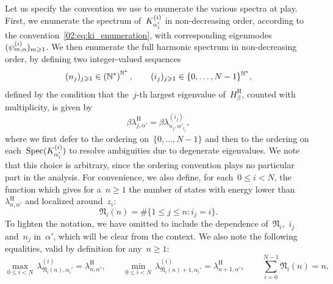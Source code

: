     Let us specify the convention we use to enumerate the various spectra at play.
    First, we enumerate the spectrum of~$K^{(i)}_{\alpha_i'}$ in non-decreasing order, according to the convention~\eqref{02:eq:ki_enumeration}, with corresponding eigenmodes~$(\psi^{(i)}_{m,\alpha})_{m\geqslant 1}$.
    We then enumerate the full harmonic spectrum in non-decreasing order, by defining two integer-valued sequences
    \begin{equation}
        \label{02:eq:eigenstate_enumeration}
        (n_j)_{j\geqslant 1}\in \left(\mathbb{N}^*\right)^{\mathbb{N}^*},\qquad (i_j)_{j\geqslant 1}\in \{0,\dots,N-1\}^{\mathbb{N}^*},
    \end{equation}
    defined by the condition that the~$j$-th largest eigenvalue of~$H_\beta^{\mathrm H}$, counted with multiplicity, is given by
    \begin{equation}
        \label{02:eq:harm_spectrum_enumeration}
        \beta\lambda_{j,\alpha'}^{\mathrm H} = \beta\lambda^{(i_j)}_{n_j,\alpha'_{i_j}},
    \end{equation}
    where we first defer to the ordering on~$\{0,\dots,N-1\}$ and then to the ordering on each~$\mathrm{Spec}(K^{(i)}_{\alpha_i'})$ to resolve ambiguities due to degenerate eigenvalues.
    We note that this choice is arbitrary, since the ordering convention plays no particular part in the analysis.
    For convenience, we also define, for each~$0\leq i <N$, the function which gives for a~$n\geq 1$ the number of states with energy lower than~$\lambda_{n,\alpha'}^{\mathrm H}$ and localized around~$z_i$:
    \begin{equation}
        \label{02:eq:def_ni}
        \mathfrak{N}_{i}(n) = \#\{ 1 \leq j \leq n: i_j = i\}.
    \end{equation}
    To lighten the notation, we have omitted to include the dependence of~$\mathfrak{N}_i$,~$i_j$ and~$n_j$ in~$\alpha'$, which will be clear from the context.
    We also note the following equalities, valid by definition for any~$n\geq 1$:
    \begin{equation}
        \label{02:eq:enumeration_relations}
        \underset{0\leq i<N}{\max}\,\lambda^{(i)}_{\mathfrak{N}_i(n),\alpha_i'}  = \lambda_{n,\alpha'}^{\mathrm H},\qquad \underset{0\leq i<N}{\min}\,\lambda^{(i)}_{\mathfrak{N}_i(n)+1,\alpha_i'} = \lambda_{n+1,\alpha'}^{\mathrm H},\qquad \sum_{i=0}^{N-1} \mathfrak{N}_i(n) = n.
    \end{equation}

